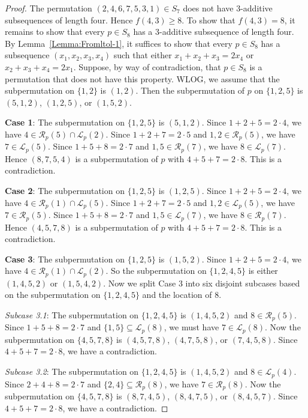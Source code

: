 \documentclass[11pt]{article}
\theoremstyle{definition}
\begin{document}
\begin{proof}
The permutation $(2,4,6,7,5,3,1)\in S_7$ does not have $3$-additive subsequences of length four. Hence $f(4,3)\geq8$. To show that $f(4,3)=8$, it remains to show that every $p\in S_8$ has a $3$-additive subsequence of length four. By Lemma~\ref{Lemma:Fromltol-1}, it suffices to show that every $p\in S_8$ has a subsequence $(x_1,x_2,x_3,x_4)$ such that either $x_1+x_2+x_3=2x_4$ or $x_2+x_3+x_4=2x_1$.  Suppose, by way of contradiction, that $p\in S_8$ is a permutation that does not have this property. WLOG, we assume that the subpermutation on $\{1,2\}$ is $(1,2)$. Then the subpermutation of $p$ on $\{1,2,5\}$ is $(5,1,2)$, $(1,2,5)$, or $(1,5,2)$.

\textbf{Case 1}: The subpermutation on $\{1,2,5\}$ is $(5,1,2)$. Since $1+2+5=2\cdot4$, we have $4\in\mathcal{R}_p(5)\cap\mathcal{L}_p(2)$. Since $1+2+7=2\cdot5$ and $1,2\in\mathcal{R}_p(5)$, we have $7\in\mathcal{L}_p(5)$. Since $1+5+8=2\cdot7$ and $1,5\in\mathcal{R}_p(7)$, we have $8\in\mathcal{L}_p(7)$. Hence $(8,7,5,4)$ is a subpermutation of $p$ with $4+5+7=2\cdot8$. This is a contradiction.

\textbf{Case 2}: The subpermutation on $\{1,2,5\}$ is $(1,2,5)$. Since $1+2+5=2\cdot4$, we have $4\in\mathcal{R}_p(1)\cap\mathcal{L}_p(5)$. Since $1+2+7=2\cdot5$ and $1,2\in\mathcal{L}_p(5)$, we have $7\in\mathcal{R}_p(5)$. Since $1+5+8=2\cdot7$ and $1,5\in\mathcal{L}_p(7)$, we have $8\in\mathcal{R}_p(7)$. Hence $(4,5,7,8)$ is a subpermutation of $p$ with $4+5+7=2\cdot8$. This is a contradiction.

\textbf{Case 3}: The subpermutation on $\{1,2,5\}$ is $(1,5,2)$. Since $1+2+5=2\cdot4$, we have $4\in\mathcal{R}_p(1)\cap\mathcal{L}_p(2)$. So the subpermutation on $\{1,2,4,5\}$ is either $(1,4,5,2)$ or $(1,5,4,2)$. Now we split Case 3 into six disjoint subcases based on the subpermutation on $\{1,2,4,5\}$ and the location of $8$.

\textit{Subcase 3.1}: The subpermutation on $\{1,2,4,5\}$ is $(1,4,5,2)$ and $8\in\mathcal{R}_p(5)$. Since $1+5+8=2\cdot7$ and $\{1,5\}\subseteq\mathcal{L}_p(8)$, we must have $7\in\mathcal{L}_p(8)$. Now the subpermutation on $\{4,5,7,8\}$ is $(4,5,7,8)$, $(4,7,5,8)$, or $(7,4,5,8)$. Since $4+5+7=2\cdot8$, we have a contradiction.

\textit{Subcase 3.2}: The subpermutation on $\{1,2,4,5\}$ is $(1,4,5,2)$ and $8\in\mathcal{L}_p(4)$. Since $2+4+8=2\cdot7$ and $\{2,4\}\subseteq\mathcal{R}_p(8)$, we have $7\in\mathcal{R}_p(8)$. Now the subpermutation on $\{4,5,7,8\}$ is $(8,7,4,5)$, $(8,4,7,5)$, or $(8,4,5,7)$. Since $4+5+7=2\cdot8$, we have a contradiction.


\end{proof}
\end{document}
